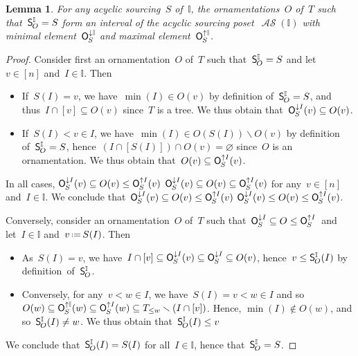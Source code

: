 \documentclass{amsart}
\newtheorem{lemma}[theorem]{Lemma}
\theoremstyle{definition}
\newcommand{\ssm}{\smallsetminus} %
\newcommand{\eqdef}{\mbox{\,\raisebox{0.2ex}{\scriptsize\ensuremath{\mathrm:}}\ensuremath{=}\,}} %
\newcommand{\felix}[1]{{\color{orange}#1}}
\newcommand{\Felix}[2][]{\todo[size=\tiny,color=orange,#1]{ #2 \\ \hfill --- F.}\,}
\newcommand{\lessin}[2]{#1_{\le#2}} %
\newcommand{\mymap}[2]{\mathsf{#1}_{\hspace{-.7pt}#2}}
\newcommand{\minorn}[2]{\mymap{O}{#1}^{\downarrow#2}}  %
\newcommand{\maxorn}[2]{\mymap{O}{#1}^{\uparrow#2}}  %
\newcommand{\sour}[1]{\mymap{S}{#1}}  %
\DeclareMathOperator{\ASour}{\mathcal{AS}}  %
\newcommand{\II}{\mathbb I} %
\begin{document}
\begin{lemma}
\label{lem:Sour2OrnIntreeval2}
For any acyclic sourcing~$S$ of~$\II$, the ornamentations~$O$ of~$T$ such that~$\sour{O}^\II = S$ form an interval of the acyclic sourcing poset~$\ASour(\II)$ with minimal element~$\minorn{S}{\II}$ and maximal element~$\maxorn{S}{\II}$.
\end{lemma}

\begin{proof}
Consider first an ornamentation~$O$ of~$T$ such that~$\sour{O}^\II = S$ and let~$v \in [n]$ and~$I \in \II$. Then
\begin{itemize}
\item If~$S(I) = v$, we have~$\min(I) \in O(v)$ by definition of~$\sour{O}^\II = S$, and thus~$I \cap [v] \subseteq O(v)$ since~$T$ is a tree.
We thus obtain that~$\minorn{S}{I}(v) \subseteq O(v)$.
\item If~$S(I) < v \in I$, we have~$\min(I) \in O(S(I)) \ssm O(v)$ by definition of~$\sour{O}^\II = S$, hence~$(I \cap [S(I)]) \cap O(v) = \varnothing$ since~$O$ is an ornamentation.
We thus obtain that~$O(v) \subseteq \maxorn{S}{I}(v)$.
\end{itemize}
In all cases, \sout{$\minorn{S}{I}(v) \subseteq O(v) \le \maxorn{S}{I}(v)$} \felix{$\minorn{S}{I}(v) \subseteq O(v) \subseteq \maxorn{S}{I}(v)$} for any~$v \in [n]$ and~$I \in \II$.
We conclude that~\sout{$\minorn{S}{I}(v) \subseteq O(v) \le \maxorn{S}{I}(v)$} \felix{$\minorn{S}{I}(v) \le O(v) \le \maxorn{S}{I}(v)$}.

Conversely, consider an ornamentation~$O$ of~$T$ such that~$\minorn{S}{I} \subseteq O \le \maxorn{S}{I}$\Felix{We want $\le$ of $\subseteq$ here?} and let~$I \in \II$ and~$v \eqdef S(I)$. Then
\begin{itemize}
\item As~$S(I) = v$, we have~$I \cap [v] \subseteq \minorn{S}{I}(v) \subseteq \minorn{S}{I} \subseteq O(v)$, hence~$v \le \sour{O}^\II(I)$ by definition~of~$\sour{O}^\II$.
\item Conversely, for any~$v < w \in I$, we have~$S(I) = v < w \in I$ and so~$O(w) \subseteq \maxorn{S}{\II}(w) \subseteq \maxorn{S}{I}(w) \subseteq \lessin{T}{w} \ssm (I \cap [v])$. Hence, $\min(I) \notin O(w)$, and so~$\sour{O}^\II(I) \ne w$. We thus obtain that~$\sour{O}^\II(I) \le v$
\end{itemize}
We conclude that~$\sour{O}^\II(I) = S(I)$ for all~$I \in \II$, hence that~$\sour{O}^\II = S$.
\end{proof}
\end{document}
